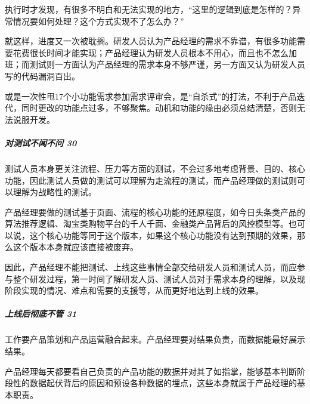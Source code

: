 \documentclass[letterpaper,10pt,english]{sphinxmanual}
\begin{document}
执行时才发现，有很多不明白和无法实现的地方，“这里的逻辑到底是怎样的？异常情况要如何处理？这个方式实现不了怎么办？”

就这样，进度又一次被耽搁。研发人员认为产品经理的需求不靠谱，有很多功能需要花费很长时间才能实现；产品经理认为研发人员根本不用心，而且也不怎么加班；而测试则一方面认为产品经理的需求本身不够严谨，另一方面又认为研发人员写的代码漏洞百出。

或是一次性甩17个小功能需求参加需求评审会，是“自杀式”的打法，不利于产品迭代，同时更改的功能点过多，不够聚焦。动机和功能的缘由必须总结清楚，否则无法说服开发。%
\begin{footnote}[176]\sphinxAtStartFootnote
{}
%
\end{footnote}


\subparagraph{对测试不闻不问 30\sphinxfootnotemark[177]}
\label{\detokenize{chapter_introduction/PM:id13}}%
\begin{footnotetext}[177]\sphinxAtStartFootnote
{}
%
\end{footnotetext}\ignorespaces 
测试人员本身更关注流程、压力等方面的测试，不会过多地考虑背景、目的、核心功能，因此测试人员做的测试可以理解为走流程的测试，而产品经理做的测试则可以理解为战略性的测试。

产品经理要做的测试基于页面、流程的核心功能的还原程度，如今日头条类产品的算法推荐逻辑、淘宝类购物平台的千人千面、金融类产品背后的风控模型等。也可以说，这个核心功能等同于这个版本，如果这个核心功能没有达到预期的效果，那么这个版本本身就应该直接被废弃。

因此，产品经理不能把测试、上线这些事情全部交给研发人员和测试人员，而应参与整个研发过程，第一时间了解研发人员、测试人员对于需求本身的理解，以及现阶段实现的情况、难点和需要的支援等，从而更好地达到上线的效果。


\subparagraph{上线后彻底不管 31\sphinxfootnotemark[178]}
\label{\detokenize{chapter_introduction/PM:id14}}%
\begin{footnotetext}[178]\sphinxAtStartFootnote
{}
%
\end{footnotetext}\ignorespaces 
工作要产品策划和产品运营融合起来。产品经理要对结果负责，而数据能最好展示结果。

产品经理每天都要看自己负责的产品功能的数据并对其了如指掌，能够基本判断阶段性的数据起伏背后的原因和预设各种数据的埋点，这些本身就属于产品经理的基本职责。
\end{document}
